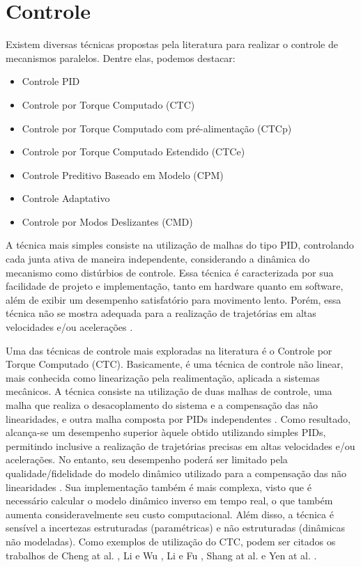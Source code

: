 \documentclass[]{politex}
\begin{document}
\section{Controle}

Existem diversas técnicas propostas pela literatura para realizar o controle de mecanismos paralelos. Dentre elas, podemos destacar:

\begin{itemize}
\item Controle PID
\item Controle por Torque Computado (CTC)
\item Controle por Torque Computado com pré-alimentação (CTCp)
\item Controle por Torque Computado Estendido (CTCe)
\item Controle Preditivo Baseado em Modelo (CPM)
\item Controle Adaptativo
\item Controle por Modos Deslizantes (CMD)
\end{itemize}

A técnica mais simples consiste na utilização de malhas do tipo PID, controlando cada junta ativa de maneira independente, considerando a dinâmica do mecanismo como distúrbios de controle. Essa técnica é caracterizada por sua facilidade de projeto e implementação, tanto em hardware quanto em software, além de exibir um desempenho satisfatório para movimento lento. Porém, essa técnica não se mostra adequada para a realização de trajetórias em altas velocidades e/ou acelerações \cite{Honegger, Zubizarreta}.

Uma das técnicas de controle mais exploradas na literatura é o Controle por Torque Computado (CTC). Basicamente, é uma técnica de controle não linear, mais conhecida como linearização pela realimentação, aplicada a sistemas mecânicos. A técnica consiste na utilização de duas malhas de controle, uma malha que realiza o desacoplamento do sistema e a compensação das não linearidades, e outra malha composta por PIDs independentes \cite{Craig}. Como resultado, alcança-se um desempenho  superior  àquele obtido utilizando simples PIDs, permitindo inclusive a realização de trajetórias precisas em altas velocidades e/ou acelerações. No entanto, seu desempenho poderá ser limitado pela qualidade/fidelidade do modelo dinâmico utilizado para a compensação das não linearidades \cite{SlotiniSMC}. Sua implementação também é mais complexa, visto que é necessário calcular o modelo dinâmico inverso em tempo real, o que também aumenta consideravelmente seu custo computacional. Além disso, a técnica é sensível a incertezas estruturadas (paramétricas) e não estruturadas (dinâmicas não modeladas). Como exemplos de utilização do CTC, podem ser citados os trabalhos de Cheng at al. \cite{Cheng}, Li e Wu \cite{Li}, Li e Fu \cite{Li2}, Shang at al. \cite{Shang} e Yen at al. \cite{Yen}.
\end{document}
